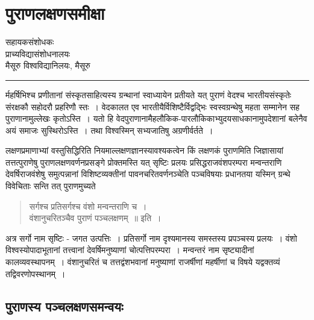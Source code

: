 \chapter{पुराणलक्षणसमीक्षा}

\begin{center}
\smallskip

सहायकसंशोधकः\\
प्राच्यविद्यासंशोधनालयः\\
मैसूरु विश्वविद्यानिलयः, मैसूरु
\rule{\textwidth}{0.1pt}
\end{center}

र्महर्षिभिश्च प्रणीतानां संस्कृतसाहित्यस्य ग्रन्थानां स्वाध्यायेन प्रतीयते यत् पुराणं वेदश्च भारतीयसंस्कृतेः संरक्षकौ सहोदरौ प्रहरिणौ स्तः~। वेदकालत एव भारतीयैर्विशिष्टैर्विद्वद्भिः स्वस्वग्रन्थेषु महता सम्मानेन सह पुराणानामुल्लेखः कृतोऽस्ति~। यतो हि वेदपुराणानामैहलौकिक-पारलौकिकाभ्युदयसाधकानामुपदेशानां बलेनैव अयं समाजः सुस्थिरोऽस्ति~। तथा विश्वस्मिन् सभ्यजातिषु अग्रणीर्वर्तते~।

लक्षणप्रमाणाभ्यां वस्तुसिद्धिरिति नियमाल्लक्षणज्ञानस्यावश्यकत्वेन किं लक्षणकं पुराणमिति जिज्ञासायां तत्तत्पुराणेषु पुराणलक्षणवर्णनप्रसङ्गे प्रोक्तमस्ति यत् सृष्टिः प्रलयः प्रसिद्धराजवंशपरम्परा मन्वन्तराणि देवर्षिराजवंशेषु समुत्पन्नानां विशिष्टव्यक्तीनां पावनचरितवर्णनञ्चेति पञ्चविषयाः प्रधानतया यस्मिन् ग्रन्थे विवेचिताः सन्ति तत् पुराणमुच्यते 
\begin{verse}
सर्गश्च प्रतिसर्गश्च वंशो मन्वन्तराणि च~।\\
वंशानुचरितञ्चैव पुराणं पञ्चलक्षणम्~॥ इति~।
\end{verse}
अत्र सर्गो नाम सृष्टिः - जगत उत्पत्तिः~। प्रतिसर्गो नाम दृश्यमानस्य समस्तस्य प्रपञ्चस्य प्रलयः~। वंशो विश्वस्योपादाभूतानां तत्त्वानां देवर्षिमनुष्याणां चोत्पत्तिपरम्परा~। मन्वन्तरं नाम सृष्ट्यादीनां कालव्यवस्थापनम्~। वंशानुचरितं च तत्तद्वंशभवानां मनुष्याणां राजर्षीणां महर्षीणां च विषये यद्वक्तव्यं तद्विवरणोपस्थानम्~।

\section*{पुराणस्य पञ्चलक्षणसमन्वयः}

